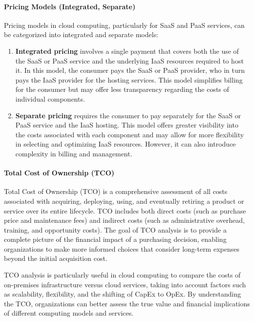 \documentclass[10pt, landscape]{article}
\begin{document}
\begin{multicols*}{4}
\paragraph{Pricing Models (Integrated,
Separate)}\label{pricing-models-integrated-separate}

Pricing models in cloud computing, particularly for SaaS and PaaS
services, can be categorized into integrated and separate models:

\begin{enumerate}
\def\labelenumi{\arabic{enumi}.}
\item
  \textbf{Integrated pricing} involves a single payment that covers both
  the use of the SaaS or PaaS service and the underlying IaaS resources
  required to host it. In this model, the consumer pays the SaaS or PaaS
  provider, who in turn pays the IaaS provider for the hosting services.
  This model simplifies billing for the consumer but may offer less
  transparency regarding the costs of individual components.
\item
  \textbf{Separate pricing} requires the consumer to pay separately for
  the SaaS or PaaS service and the IaaS hosting. This model offers
  greater visibility into the costs associated with each component and
  may allow for more flexibility in selecting and optimizing IaaS
  resources. However, it can also introduce complexity in billing and
  management.
\end{enumerate}

\paragraph{Total Cost of Ownership
(TCO)}\label{total-cost-of-ownership-tco-1}

Total Cost of Ownership (TCO) is a comprehensive assessment of all costs
associated with acquiring, deploying, using, and eventually retiring a
product or service over its entire lifecycle. TCO includes both direct
costs (such as purchase price and maintenance fees) and indirect costs
(such as administrative overhead, training, and opportunity costs). The
goal of TCO analysis is to provide a complete picture of the financial
impact of a purchasing decision, enabling organizations to make more
informed choices that consider long-term expenses beyond the initial
acquisition cost.

TCO analysis is particularly useful in cloud computing to compare the
costs of on-premises infrastructure versus cloud services, taking into
account factors such as scalability, flexibility, and the shifting of
CapEx to OpEx. By understanding the TCO, organizations can better assess
the true value and financial implications of different computing models
and services.


\end{multicols*}
\end{document}
